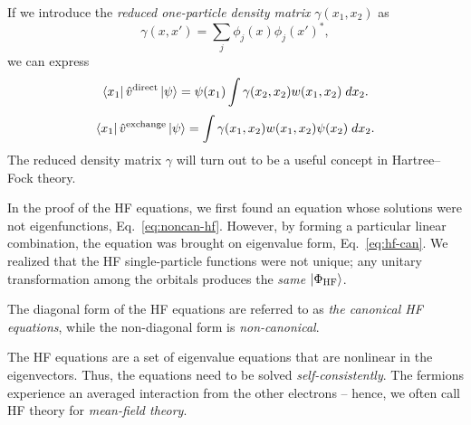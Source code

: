 \documentclass{report}
\theoremstyle{plain}
\theoremstyle{definition}
\begin{document}
If we introduce the \emph{reduced one-particle density matrix}
$\gamma(x_1,x_2)$ as
\begin{equation}
  \gamma(x,x') = \sum_j \phi_j(x)\phi_j(x')^*,
\end{equation}
we can express
\begin{equation}
  \bra{x_1}\hat{v}^\text{direct}\ket{\psi} = \psi(x_1) \int
  \gamma(x_2,x_2)w(x_1,x_2) \; dx_2 .
\end{equation}
\begin{equation}
  \bra{x_1}\hat{v}^\text{exchange}\ket{\psi} = \int
  \gamma(x_1,x_2)w(x_1,x_2)  \psi(x_2) \; dx_2 .
\end{equation}
The reduced density matrix $\gamma$ will turn out to be a useful
concept in Hartree--Fock theory.

In the proof of the HF equations, we first found an equation whose solutions were not
eigenfunctions, Eq.~\eqref{eq:noncan-hf}. However, by forming a
particular linear combination, the equation was brought on eigenvalue
form, Eq.~\eqref{eq:hf-can}. We realized that the HF single-particle
functions were not unique; any unitary transformation among the
orbitals produces the \emph{same} $\ket{\Phi_\text{HF}}$.

The diagonal form of the HF equations are referred to as \emph{the
  canonical HF equations}, while the non-diagonal form is
\emph{non-canonical}. 

The HF equations are a set of eigenvalue equations that are nonlinear
in the eigenvectors. Thus, the equations need to be solved
\emph{self-consistently}. The fermions experience an averaged
interaction from the other electrons -- hence, we often call HF theory
for \emph{mean-field theory}.


\end{document}
